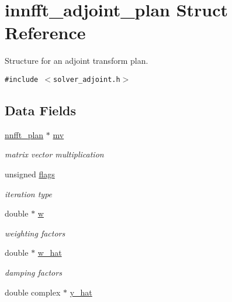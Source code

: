 \hypertarget{structinnfft__adjoint__plan}{
\section{innfft\_\-adjoint\_\-plan Struct Reference}
\label{structinnfft__adjoint__plan}
}
Structure for an adjoint transform plan.  


{\tt \#include $<$solver\_\-adjoint.h$>$}

\subsection*{Data Fields}
\begin{CompactItemize}
\item 
\hypertarget{structinnfft__adjoint__plan_o0}{
\hyperlink{structnnfft__plan}{nnfft\_\-plan} $\ast$ \hyperlink{structinnfft__adjoint__plan_o0}{mv}}
\label{structinnfft__adjoint__plan_o0}

\begin{CompactList}\small\item\em matrix vector multiplication \item\end{CompactList}\item 
\hypertarget{structinnfft__adjoint__plan_o1}{
unsigned \hyperlink{structinnfft__adjoint__plan_o1}{flags}}
\label{structinnfft__adjoint__plan_o1}

\begin{CompactList}\small\item\em iteration type \item\end{CompactList}\item 
\hypertarget{structinnfft__adjoint__plan_o2}{
double $\ast$ \hyperlink{structinnfft__adjoint__plan_o2}{w}}
\label{structinnfft__adjoint__plan_o2}

\begin{CompactList}\small\item\em weighting factors \item\end{CompactList}\item 
\hypertarget{structinnfft__adjoint__plan_o3}{
double $\ast$ \hyperlink{structinnfft__adjoint__plan_o3}{w\_\-hat}}
\label{structinnfft__adjoint__plan_o3}

\begin{CompactList}\small\item\em damping factors \item\end{CompactList}\item 
\hypertarget{structinnfft__adjoint__plan_o4}{
double complex $\ast$ \hyperlink{structinnfft__adjoint__plan_o4}{y\_\-hat}}
\label{structinnfft__adjoint__plan_o4}


\end{CompactItemize}
